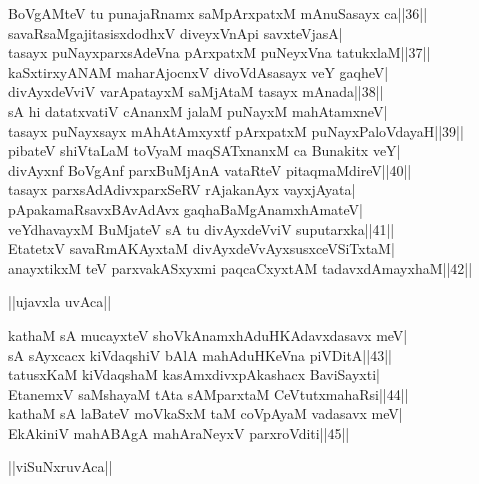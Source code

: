 \documentclass{article}
\begin{document}
BoVgAMteV tu punajaRnamx saMpArxpatxM mAnuSasayx ca||36||\\
savaRsaMgajitasisxdodhxV diveyxVnApi savxteVjasA|\\
tasayx puNayxparxsAdeVna pArxpatxM puNeyxVna tatukxlaM||37||\\
kaSxtirxyANAM maharAjocnxV divoVdAsasayx veY gaqheV|\\
divAyxdeVviV varApatayxM saMjAtaM tasayx mAnada||38||\\
sA hi datatxvatiV cAnanxM jalaM puNayxM mahAtamxneV|\\
tasayx puNayxsayx mAhAtAmxyxtf pArxpatxM puNayxPaloVdayaH||39||\\
pibateV shiVtaLaM toVyaM maqSATxnanxM ca Bunakitx veY|\\
divAyxnf BoVgAnf parxBuMjAnA vataRteV pitaqmaMdireV||40||\\
tasayx parxsAdAdivxparxSeRV rAjakanAyx vayxjAyata|\\
pApakamaRsavxBAvAdAvx gaqhaBaMgAnamxhAmateV|\\
veYdhavayxM BuMjateV sA tu divAyxdeVviV suputarxka||41||\\
EtatetxV savaRmAKAyxtaM divAyxdeVvAyxsusxceVSiTxtaM|\\
anayxtikxM teV parxvakASxyxmi paqcaCxyxtAM tadavxdAmayxhaM||42||\\

\begin{center}
||ujavxla uvAca||
\end{center}

kathaM sA mucayxteV shoVkAnamxhAduHKAdavxdasavx meV|\\
sA sAyxcacx kiVdaqshiV bAlA mahAduHKeVna piVDitA||43||\\
tatusxKaM kiVdaqshaM kasAmxdivxpAkashacx BaviSayxti|\\
EtanemxV saMshayaM tAta sAMparxtaM CeVtutxmahaRsi||44||\\
kathaM sA laBateV moVkaSxM taM coVpAyaM vadasavx meV|\\
EkAkiniV mahABAgA mahAraNeyxV parxroVditi||45||\\

\begin{center}
||viSuNxruvAca||
\end{center}
\end{document}

